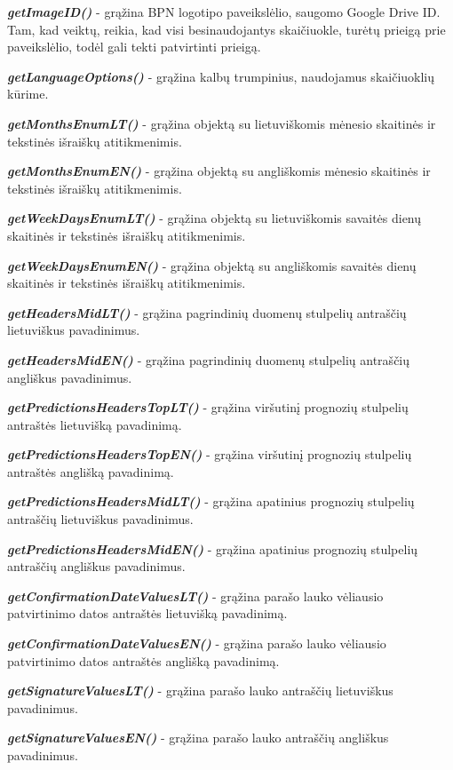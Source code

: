 \textit{\textbf{getImageID()}} - grąžina BPN logotipo paveikslėlio, saugomo Google Drive ID. Tam, kad veiktų, reikia, kad visi besinaudojantys skaičiuokle, turėtų prieigą prie paveikslėlio, todėl gali tekti patvirtinti prieigą. 

\textit{\textbf{getLanguageOptions()}} - grąžina kalbų trumpinius, naudojamus skaičiuoklių kūrime. 

\textit{\textbf{getMonthsEnumLT()}} - grąžina objektą su lietuviškomis mėnesio skaitinės ir tekstinės išraiškų atitikmenimis. 

\textit{\textbf{getMonthsEnumEN()}} - grąžina objektą su angliškomis mėnesio skaitinės ir tekstinės išraiškų atitikmenimis. 

\textit{\textbf{getWeekDaysEnumLT()}} - grąžina objektą su lietuviškomis savaitės dienų skaitinės ir tekstinės išraiškų atitikmenimis. 

\textit{\textbf{getWeekDaysEnumEN()}} - grąžina objektą su angliškomis savaitės dienų skaitinės ir tekstinės išraiškų atitikmenimis. 

\textit{\textbf{getHeadersMidLT()}} - grąžina pagrindinių duomenų stulpelių antraščių lietuviškus pavadinimus. 

\textit{\textbf{getHeadersMidEN()}} - grąžina pagrindinių duomenų stulpelių antraščių angliškus pavadinimus. 

\textit{\textbf{getPredictionsHeadersTopLT()}} - grąžina viršutinį prognozių stulpelių antraštės lietuvišką pavadinimą. 

\textit{\textbf{getPredictionsHeadersTopEN()}} - grąžina viršutinį prognozių stulpelių antraštės anglišką pavadinimą. 

\textit{\textbf{getPredictionsHeadersMidLT()}} - grąžina apatinius prognozių stulpelių antraščių lietuviškus pavadinimus.  

\textit{\textbf{getPredictionsHeadersMidEN()}} - grąžina apatinius prognozių stulpelių antraščių angliškus pavadinimus. 

\textit{\textbf{getConfirmationDateValuesLT()}} - grąžina parašo lauko vėliausio patvirtinimo datos antraštės lietuvišką pavadinimą. 

\textit{\textbf{getConfirmationDateValuesEN()}} - grąžina parašo lauko vėliausio patvirtinimo datos antraštės anglišką pavadinimą.  

\textit{\textbf{getSignatureValuesLT()}} - grąžina parašo lauko antraščių lietuviškus pavadinimus. 

\textit{\textbf{getSignatureValuesEN()}} - grąžina parašo lauko antraščių angliškus pavadinimus. 


